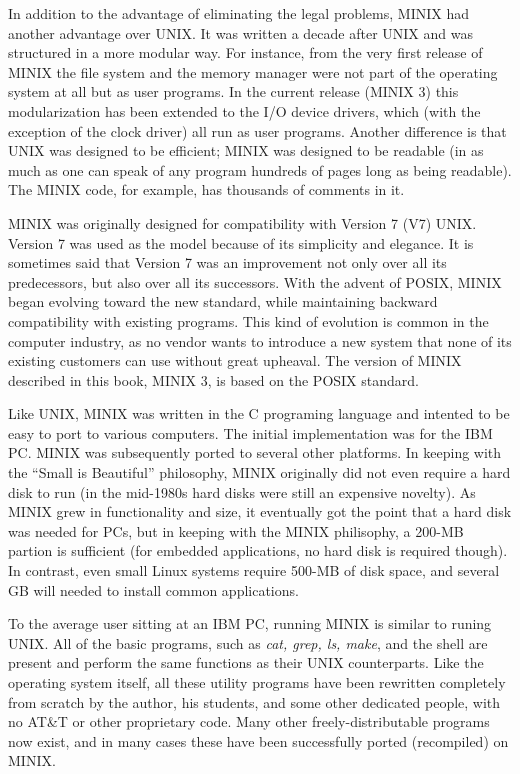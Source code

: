 \documentclass{book}
\newcommand {\sys} [1] {\textsl{#1}}
\begin{document}
In addition to the advantage of eliminating the legal problems, MINIX had another advantage over UNIX.
It was written a decade after UNIX and was structured in a more modular way.
For instance, from the very first release of MINIX the file system and the memory manager 
were not part of the operating system at all but as user programs.
In the current release (MINIX 3) this modularization has been extended to the I/O device drivers, 
which (with the exception of the clock driver) all run as user programs.
Another difference is that UNIX was designed to be efficient; MINIX was designed to be readable 
(in as much as one can speak of any program hundreds of pages long as being readable).
The MINIX code, for example, has thousands of comments in it.

MINIX was originally designed for compatibility with Version 7 (V7) UNIX. Version 7 was used as the model because of its simplicity and elegance.
It is sometimes said that Version 7 was an improvement not only over all its predecessors, but also over all its successors.
With the advent of POSIX, MINIX began evolving toward the new standard, while maintaining backward compatibility with existing programs.
This kind of evolution is common in the computer industry, as no vendor wants to introduce a new system 
that none of its existing customers can use without great upheaval.
The version of MINIX described in this book, MINIX 3, is based on the POSIX standard.

Like UNIX, MINIX was written in the C programing language and intented to be easy to port to various computers.
The initial implementation was for the IBM PC.
MINIX was subsequently ported to several other platforms.
In keeping with the ``Small is Beautiful'' philosophy, MINIX originally did not even require a hard disk to run 
(in the mid-1980s hard disks were still an expensive novelty).
As MINIX grew in functionality and size, it eventually got the point that a hard disk was needed for PCs,
but in keeping with the MINIX philisophy, a 200-MB partion is sufficient (for embedded applications, no hard disk is required though).
In contrast, even small Linux systems require 500-MB of disk space, and several GB will needed to install common applications.

To the average user sitting at an IBM PC, running MINIX is similar to runing UNIX.
All of the basic programs, such as \sys{cat, grep, ls, make}, and the shell are present and perform the same functions as their UNIX counterparts. 
Like the operating system itself, all these utility programs have been rewritten completely from scratch by the author, 
his students, and some other dedicated people, with no AT\&T or other proprietary code.
Many other freely-distributable programs now exist, and in many cases these have been successfully ported (recompiled) on MINIX.
\end{document}
